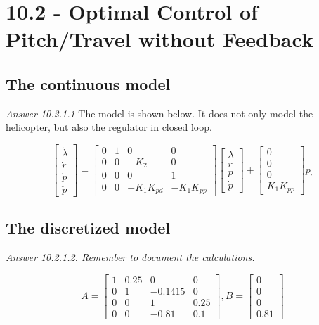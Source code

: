 \section{10.2 - Optimal Control of Pitch/Travel without Feedback }

\subsection{The continuous model}
\textit{Answer 10.2.1.1}
The model is shown below. It does not only model the helicopter, but also the regulator in closed loop.

\[\begin{bmatrix}
    \dot\lambda \\ \dot{r} \\ \dot{p} \\ \ddot{p}
\end{bmatrix} =
\begin{bmatrix}
    0 & 1 & 0 & 0 \\
    0 & 0 & -K_2 & 0 \\
    0 & 0 & 0 & 1 \\
    0 & 0 & -K_1K_{pd} & -K_1K_{pp} 
\end{bmatrix}
\begin{bmatrix}
    \lambda \\ r \\ p \\ \dot{p}
\end{bmatrix}+
\begin{bmatrix}
    0 \\ 0 \\ 0 \\ K_1K_{pp}
\end{bmatrix}p_c\]

\subsection{The discretized model}
\textit{Answer 10.2.1.2. Remember to document the calculations.}

\[
A=
\begin{bmatrix}
    1 & 0.25 & 0 & 0 \\
    0 & 1 & -0.1415 & 0 \\
    0 & 0 & 1 & 0.25 \\
    0 & 0 & -0.81 & 0.1 
\end{bmatrix},
B=
\begin{bmatrix}
    0 \\ 0 \\ 0 \\ 0.81
\end{bmatrix}
\]

